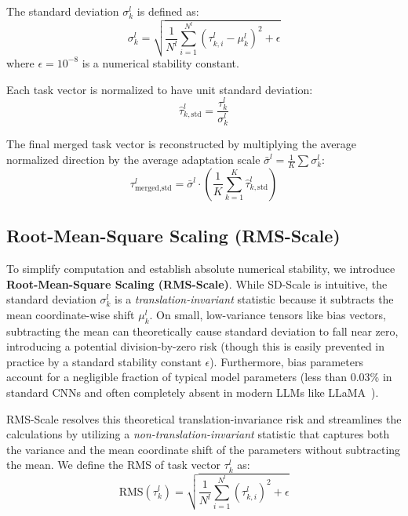 The standard deviation $\sigma_k^l$ is defined as:
\begin{equation}
\sigma_k^l = \sqrt{\frac{1}{N^l} \sum_{i=1}^{N^l} (\tau_{k, i}^l - \mu_k^l)^2 + \epsilon}
\end{equation}
where $\epsilon = 10^{-8}$ is a numerical stability constant. 

Each task vector is normalized to have unit standard deviation:
\begin{equation}
\hat{\tau}_{k, \text{std}}^l = \frac{\tau_k^l}{\sigma_k^l}
\end{equation}

The final merged task vector is reconstructed by multiplying the average normalized direction by the average adaptation scale $\bar{\sigma}^l = \frac{1}{K}\sum \sigma_k^l$:
\begin{equation}
\tau_{\text{merged}, \text{std}}^l = \bar{\sigma}^l \cdot \left( \frac{1}{K} \sum_{k=1}^K \hat{\tau}_{k, \text{std}}^l \right)
\end{equation}

\subsection{Root-Mean-Square Scaling (RMS-Scale)}
To simplify computation and establish absolute numerical stability, we introduce \textbf{Root-Mean-Square Scaling (RMS-Scale)}. While SD-Scale is intuitive, the standard deviation $\sigma_k^l$ is a \textit{translation-invariant} statistic because it subtracts the mean coordinate-wise shift $\mu_k^l$. On small, low-variance tensors like bias vectors, subtracting the mean can theoretically cause standard deviation to fall near zero, introducing a potential division-by-zero risk (though this is easily prevented in practice by a standard stability constant $\epsilon$). Furthermore, bias parameters account for a negligible fraction of typical model parameters (less than 0.03\% in standard CNNs and often completely absent in modern LLMs like LLaMA~\cite{touvron2023llama}).

RMS-Scale resolves this theoretical translation-invariance risk and streamlines the calculations by utilizing a \textit{non-translation-invariant} statistic that captures both the variance and the mean coordinate shift of the parameters without subtracting the mean. We define the RMS of task vector $\tau_k^l$ as:
\begin{equation}
\text{RMS}(\tau_k^l) = \sqrt{\frac{1}{N^l} \sum_{i=1}^{N^l} (\tau_{k, i}^l)^2 + \epsilon}
\end{equation}

